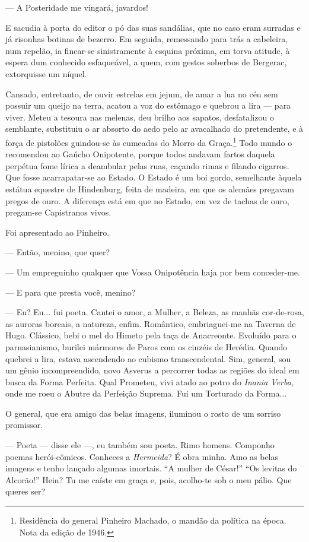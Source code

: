 --- A Posteridade me vingará, javardos!

E sacudia à porta do editor o pó das suas sandálias, que no caso eram
surradas e já risonhas botinas de bezerro. Em seguida, remessando para
trás a cabeleira, num repelão, ia fincar-se sinistramente à esquina
próxima, em torva atitude, à espera dum conhecido esfaqueável, a quem,
com gestos soberbos de Bergerac, extorquisse um níquel.

Cansado, entretanto, de ouvir estrelas em jejum, de amar a lua no céu
sem possuir um queijo na terra, acatou a voz do estômago e quebrou a
lira --- para viver. Meteu a tesoura nas melenas, deu brilho aos
sapatos, desfatalizou o semblante, substituiu o ar absorto do aedo pelo
ar avacalhado do pretendente, e à força de pistolões guindou-se às
cumeadas do Morro da Graça.\footnote{Residência do general Pinheiro
  Machado, o mandão da política na época. Nota da edição de 1946.} Todo
mundo o recomendou ao Gaúcho Onipotente, porque todos andavam fartos
daquela perpétua fome lírica a deambular pelas ruas, caçando rimas e
filando cigarros. Que fosse acarrapatar-se ao Estado. O Estado é um boi
gordo, semelhante àquela estátua equestre de Hindenburg, feita de
madeira, em que os alemães pregavam pregos de ouro. A diferença está em
que no Estado, em vez de tachas de ouro, pregam-se Capistranos vivos.

Foi apresentado ao Pinheiro.

--- Então, menino, que quer?

--- Um empreguinho qualquer que Vossa Onipotência haja por bem
conceder-me.

--- E para que presta você, menino?

--- Eu? Eu... fui poeta. Cantei o amor, a Mulher, a Beleza, as manhãs
cor-de-rosa, as auroras boreais, a natureza, enfim. Romântico,
embriaguei-me na Taverna de Hugo. Clássico, bebi o mel do Himeto pela
taça de Anacreonte. Evoluído para o parnasianismo, burilei mármores de
Paros com os cinzéis de Herédia. Quando quebrei a lira, estava
ascendendo ao cubismo transcendental. Sim, general, sou um gênio
incompreendido, novo Asverus a percorrer todas as regiões do ideal em
busca da Forma Perfeita. Qual Prometeu, vivi atado ao potro do
\emph{Inania Verba}, onde me roeu o Abutre da Perfeição Suprema. Fui um
Torturado da Forma...

O general, que era amigo das belas imagens, iluminou o rosto de um
sorriso promissor.

--- Poeta --- disse ele ---, eu também sou poeta. Rimo homens. Componho
poemas herói-cômicos. Conheces a \emph{Hermeida}? É obra minha. Amo as
belas imagens e tenho lançado algumas imortais. ``A mulher de César!''
``Os levitas do Alcorão!'' Hein? Tu me caíste em graça e, pois,
acolho-te sob o meu pálio. Que queres ser?


